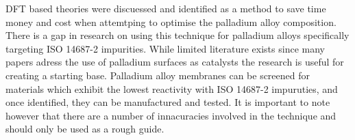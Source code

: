 DFT based theories were discuessed and identified as a method to save time money and cost when attemtping to optimise the palladium alloy composition. There is a gap in research on using this technique for palladium alloys specifically targeting ISO 14687-2 impurities. While limited literature exists since many papers adress the use of palladium surfaces as catalysts the research is useful for creating a starting base. Palladium alloy membranes can be screened for materials which exhibit the lowest reactivity with ISO 14687-2 impuruties, and once identified, they can be manufactured and tested. It is important to note however that there are a number of innacuracies involved in the technique and should only be used as a rough guide. 





